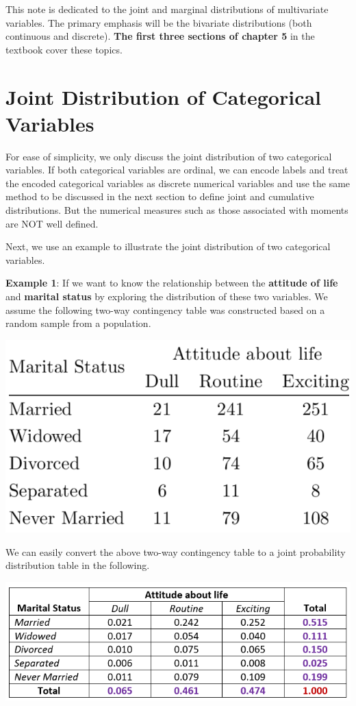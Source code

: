 \documentclass[
]{book}
\begin{document}
This note is dedicated to the joint and marginal distributions of multivariate variables. The primary emphasis will be the bivariate distributions (both continuous and discrete). \textbf{The first three sections of chapter 5} in the textbook cover these topics.

\hypertarget{joint-distribution-of-categorical-variables}{%
\section{Joint Distribution of Categorical Variables}\label{joint-distribution-of-categorical-variables}}

For ease of simplicity, we only discuss the joint distribution of two categorical variables. If both categorical variables are ordinal, we can encode labels and treat the encoded categorical variables as discrete numerical variables and use the same method to be discussed in the next section to define joint and cumulative distributions. But the numerical measures such as those associated with moments are NOT well defined.

Next, we use an example to illustrate the joint distribution of two categorical variables.

\textbf{Example 1}: If we want to know the relationship between the \textbf{attitude of life} and \textbf{marital status} by exploring the distribution of these two variables. We assume the following two-way contingency table was constructed based on a random sample from a population.

\begin{center}\includegraphics[width=0.4\linewidth]{topic06/twoNominalCateFreqTables} \end{center}

We can easily convert the above two-way contingency table to a joint probability distribution table in the following.

\begin{center}\includegraphics[width=0.55\linewidth]{topic06/twoNominalCateJointDistTables} \end{center}
\end{document}
